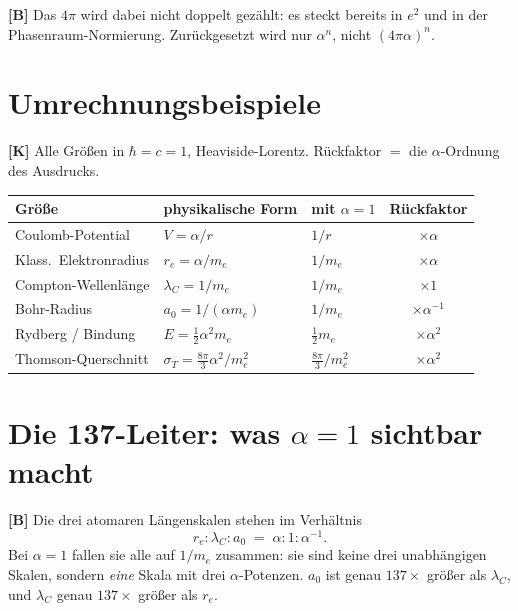 \textbf{[B]} Das $4\pi$ wird dabei nicht doppelt gezählt: es steckt bereits
in $e^2$ und in der Phasenraum-Normierung. Zurückgesetzt wird nur $\alpha^n$,
nicht $(4\pi\alpha)^n$.

\section{Umrechnungsbeispiele}

\textbf{[K]} Alle Größen in $\hbar=c=1$, Heaviside-Lorentz.
Rückfaktor $=$ die $\alpha$-Ordnung des Ausdrucks.

\begin{center}
\renewcommand{\arraystretch}{1.35}
{\small
\begin{tabular}{lllc}
\toprule
Größe & physikalische Form & mit $\alpha{=}1$ & Rückfaktor \\
\midrule
Coulomb-Potential      & $V = \alpha/r$                         & $1/r$           & $\times\alpha$      \\
Klass.\ Elektronradius & $r_e = \alpha/m_e$                     & $1/m_e$         & $\times\alpha$      \\
Compton-Wellenlänge    & $\lambda_C = 1/m_e$                    & $1/m_e$         & $\times 1$          \\
Bohr-Radius            & $a_0 = 1/(\alpha m_e)$                 & $1/m_e$         & $\times\alpha^{-1}$ \\
Rydberg / Bindung      & $E = \tfrac12\alpha^2 m_e$             & $\tfrac12 m_e$  & $\times\alpha^2$    \\
Thomson-Querschnitt    & $\sigma_T = \tfrac{8\pi}{3}\alpha^2/m_e^2$ & $\tfrac{8\pi}{3}/m_e^2$ & $\times\alpha^2$ \\
\bottomrule
\end{tabular}
}
\renewcommand{\arraystretch}{1.0}
\end{center}

\section{Die 137-Leiter: was $\alpha=1$ sichtbar macht}

\textbf{[B]} Die drei atomaren Längenskalen stehen im Verhältnis
\[
  r_e : \lambda_C : a_0 \;=\; \alpha : 1 : \alpha^{-1}.
\]
Bei $\alpha=1$ fallen sie alle auf $1/m_e$ zusammen: sie sind keine drei
unabhängigen Skalen, sondern \emph{eine} Skala mit drei $\alpha$-Potenzen.
$a_0$ ist genau $137\times$ größer als $\lambda_C$, und $\lambda_C$ genau
$137\times$ größer als $r_e$.


